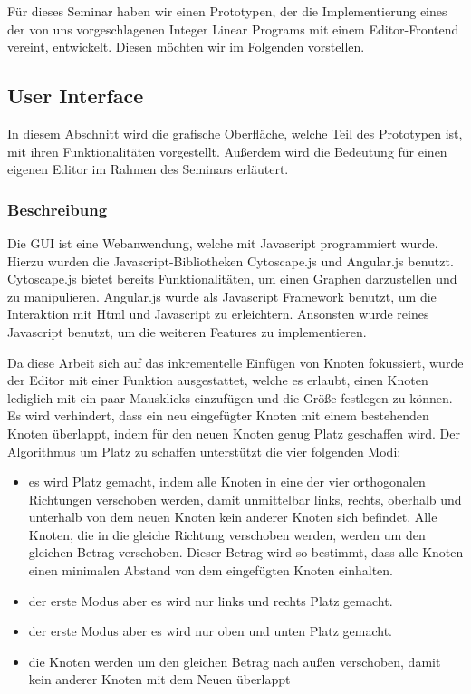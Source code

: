 Für dieses Seminar haben wir einen Prototypen, der die Implementierung eines der von uns vorgeschlagenen Integer Linear Programs mit einem Editor-Frontend vereint, entwickelt. Diesen möchten wir im Folgenden vorstellen.

\subsection{User Interface}

In diesem Abschnitt wird die grafische Oberfläche, welche Teil des Prototypen ist, mit ihren
Funktionalitäten vorgestellt. Außerdem wird die Bedeutung für einen eigenen Editor im
Rahmen des Seminars erläutert.

\subsubsection{Beschreibung}

Die GUI ist eine Webanwendung, welche mit Javascript programmiert wurde. Hierzu wurden
die Javascript-Bibliotheken Cytoscape.js\cite{cytoscape} und Angular.js\cite{angularjs} benutzt. Cytoscape.js bietet bereits
Funktionalitäten, um einen Graphen darzustellen und zu manipulieren. Angular.js wurde als
Javascript Framework benutzt, um die Interaktion mit Html und Javascript zu erleichtern.
Ansonsten wurde reines Javascript benutzt, um die weiteren Features zu implementieren.

Da diese Arbeit sich auf das inkrementelle Einfügen von Knoten fokussiert, wurde der Editor
mit einer Funktion ausgestattet, welche es erlaubt, einen Knoten lediglich mit ein paar
Mausklicks einzufügen und die Größe festlegen zu können. Es wird verhindert, dass ein neu
eingefügter Knoten mit einem bestehenden Knoten überlappt, indem für den neuen Knoten
genug Platz geschaffen wird. Der Algorithmus um Platz zu schaffen unterstützt die vier
folgenden Modi:

\begin{itemize}
	\item es wird Platz gemacht, indem alle Knoten in eine der vier orthogonalen Richtungen
verschoben werden, damit unmittelbar links, rechts, oberhalb und unterhalb von dem
neuen Knoten kein anderer Knoten sich befindet. Alle Knoten, die in die gleiche
Richtung verschoben werden, werden um den gleichen Betrag verschoben. Dieser
Betrag wird so bestimmt, dass alle Knoten einen minimalen Abstand von dem
eingefügten Knoten einhalten.
	\item der erste Modus aber es wird nur links und rechts Platz gemacht.
	\item der erste Modus aber es wird nur oben und unten Platz gemacht.
	\item die Knoten werden um den gleichen Betrag nach außen verschoben, damit kein
anderer Knoten mit dem Neuen überlappt
\end{itemize}


